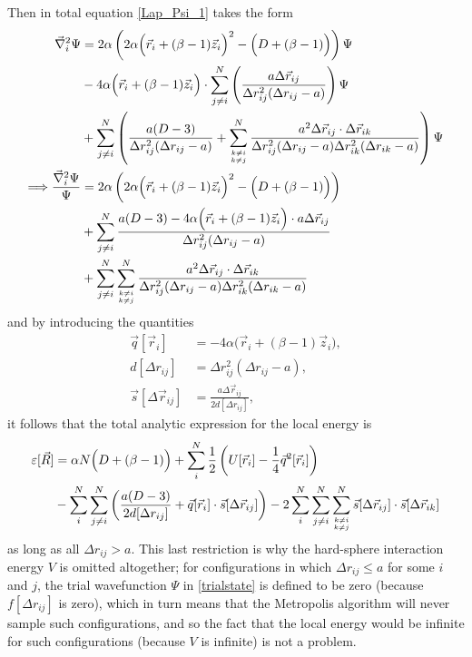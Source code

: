 \documentclass[a4paper,8pt]{article}
\begin{document}
Then in total equation \eqref{Lap_Psi_1} takes the form
\begin{align}
\vec{\nabla}_i^2\Psi &= 2\alpha\left(2\alpha\Big(\vec{r}_i+(\beta-1)\vec{z}_i\Big)^2-\Big(D+(\beta-1)\Big)\right) \Psi \nonumber\\
&- 4\alpha\Big(\vec{r}_i+(\beta-1)\vec{z}_i\Big) \cdot \sum\limits_{j \neq i}^N \left(\frac{a\Delta\vec{r}_{ij}}{\Delta{r}_{ij}^2(\Delta{r}_{ij}-a)}\right) \Psi \nonumber\\
&+ \sum\limits_{j \neq i}^N \left(\frac{a(D-3)}{\Delta{r}_{ij}^2(\Delta{r}_{ij}-a)} + \sum\limits_{{k \neq i}\atop{k \neq j}}^N \frac{a^2 \Delta\vec{r}_{ij} \cdot \Delta\vec{r}_{ik}}{\Delta{r}_{ij}^2(\Delta{r}_{ij}-a) \Delta{r}_{ik}^2(\Delta{r}_{ik}-a)}\right) \Psi \nonumber\\
\Longrightarrow \frac{\vec{\nabla}_i^2\Psi}{\Psi} &= 2\alpha\left(2\alpha\Big(\vec{r}_i+(\beta-1)\vec{z}_i\Big)^2-\Big(D+(\beta-1)\Big)\right) \nonumber\\
&+ \sum\limits_{j \neq i}^N \frac{a(D-3) - 4\alpha\Big(\vec{r}_i+(\beta-1)\vec{z}_i\Big) \cdot a\Delta\vec{r}_{ij}}{\Delta{r}_{ij}^2(\Delta{r}_{ij}-a)} \nonumber\\
&+ \sum\limits_{j \neq i}^N \sum\limits_{{k \neq i}\atop{k \neq j}}^N \frac{a^2 \Delta\vec{r}_{ij} \cdot \Delta\vec{r}_{ik}}{\Delta{r}_{ij}^2(\Delta{r}_{ij}-a) \Delta{r}_{ik}^2(\Delta{r}_{ik}-a)}
\end{align}
and by introducing the quantities
\begin{align}
\vec{q}[\vec{r}_i] &= -4\alpha\Big(\vec{r}_i+(\beta-1)\vec{z}_i\Big), \label{q}\\
d[\Delta{r}_{ij}] &= \Delta{r}_{ij}^2(\Delta{r}_{ij}-a), \label{d}\\
\vec{s}[\Delta\vec{r}_{ij}] &= \frac{a\Delta\vec{r}_{ij}}{2d[\Delta{r}_{ij}]}, \label{s}
\end{align}
it follows that the total analytic expression for the local energy is
\begin{align}
\varepsilon[\vec{R}] &= \alpha N\Big(D+(\beta-1)\Big) + \sum\limits_i^N \frac{1}{2}\left( U[\vec{r}_i] - \frac{1}{4}\vec{q}^2[\vec{r}_i] \right) \nonumber\\
&- \sum\limits_i^N \sum\limits_{j \neq i}^N \left( \frac{a(D-3)}{2d[\Delta{r}_{ij}]} + \vec{q}[\vec{r}_i] \cdot \vec{s}[\Delta\vec{r}_{ij}] \right) - 2\sum\limits_i^N \sum\limits_{j \neq i}^N \sum\limits_{{k \neq i}\atop{k \neq j}}^N \vec{s}[\Delta\vec{r}_{ij}] \cdot \vec{s}[\Delta\vec{r}_{ik}]
\end{align}
as long as all $\Delta r_{ij} > a$. This last restriction is why the hard-sphere interaction energy $V$ is omitted altogether; for configurations in which $\Delta r_{ij} \leq a$ for some $i$ and $j$, the trial wavefunction $\Psi$ in \eqref{trialstate} is defined to be zero (because $f[\Delta r_{ij}]$ is zero), which in turn means that the Metropolis algorithm will never sample such configurations, and so the fact that the local energy would be infinite for such configurations (because $V$ is infinite) is not a problem.
\end{document}
